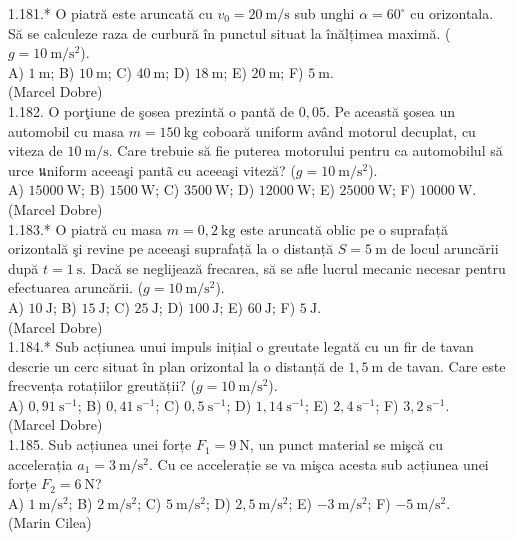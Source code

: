 1.181.* O piatră este aruncată cu $v_{0}=20 \mathrm{~m} / \mathrm{s}$ sub unghi $\alpha=60^{\circ}$ cu orizontala. Să se calculeze raza de curbură în punctul situat la înălțimea maximă. ($g=10 \mathrm{~m} / \mathrm{s}^{2}$).\\ A) $1 \mathrm{~m}$; B) $10 \mathrm{~m}$; C) $40 \mathrm{~m}$; D) $18 \mathrm{~m}$; E) $20 \mathrm{~m}$; F) $5 \mathrm{~m}$.\\ (Marcel Dobre)\\

1.182. O porţiune de şosea prezintă o pantă de $0,05$. Pe această şosea un automobil cu masa $m=150 \mathrm{~kg}$ coboară uniform având motorul decuplat, cu viteza de $10 \mathrm{~m} / \mathrm{s}$. Care trebuie să fie puterea motorului pentru ca automobilul să urce นniform aceeaşi pantã cu aceeaşi viteză? ($g=10 \mathrm{~m} / \mathrm{s}^{2}$).\\ A) $15000 \mathrm{~W}$; B) $1500 \mathrm{~W}$; C) $3500 \mathrm{~W}$; D) $12000 \mathrm{~W}$; E) $25000 \mathrm{~W}$; F) $10000 \mathrm{~W}$.\\ (Marcel Dobre)\\

1.183.* O piatră cu masa $m=0,2 \mathrm{~kg}$ este aruncată oblic pe o suprafață orizontală şi revine pe aceeaşi suprafață la o distanță $S=5 \mathrm{~m}$ de locul aruncării după $t=1 \mathrm{~s}$. Dacă se neglijează frecarea, să se afle lucrul mecanic necesar pentru efectuarea aruncării. ($g=10 \mathrm{~m} / \mathrm{s}^{2}$).\\ A) $10 \mathrm{~J}$; B) $15 \mathrm{~J}$; C) $25 \mathrm{~J}$; D) $100 \mathrm{~J}$; E) $60 \mathrm{~J}$; F) $5 \mathrm{~J}$.\\ (Marcel Dobre)\\

1.184.* Sub acțiunea unui impuls inițial o greutate legată cu un fir de tavan descrie un cerc situat în plan orizontal la o distanță de $1,5 \mathrm{~m}$ de tavan. Care este frecvența rotațiilor greutății? ($g=10 \mathrm{~m} / \mathrm{s}^{2}$).\\ A) $0,91 \mathrm{~s}^{-1}$; B) $0,41 \mathrm{~s}^{-1}$; C) $0,5 \mathrm{~s}^{-1}$; D) $1,14 \mathrm{~s}^{-1}$; E) $2,4 \mathrm{~s}^{-1}$; F) $3,2 \mathrm{~s}^{-1}$.\\ (Marcel Dobre)\\

1.185. Sub acțiunea unei forțe $F_{1}=9 \mathrm{~N}$, un punct material se mişcă cu accelerația $a_{1}=3 \mathrm{~m} / \mathrm{s}^{2}$. Cu ce accelerație se va mişca acesta sub acțiunea unei forțe $F_{2}=6 \mathrm{~N}$?\\ A) $1 \mathrm{~m} / \mathrm{s}^{2}$; B) $2 \mathrm{~m} / \mathrm{s}^{2}$; C) $5 \mathrm{~m} / \mathrm{s}^{2}$; D) $2,5 \mathrm{~m} / \mathrm{s}^{2}$; E) $-3 \mathrm{~m} / \mathrm{s}^{2}$; F) $-5 \mathrm{~m} / \mathrm{s}^{2}$.\\ (Marin Cilea)\\

